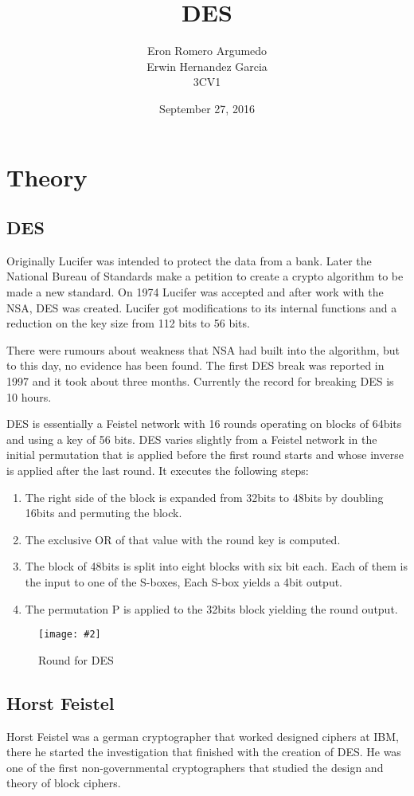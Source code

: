 \documentclass[titlepage, 12pt]{article}
\title{DES}
\author{Eron Romero Argumedo\\Erwin Hernandez Garcia\\3CV1}
\date{September 27, 2016}
\numberwithin{equation}{section}%
\numberwithin{figure}{section}%
\numberwithin{table}{section}%
\newcommand{\imagen}[4][]{
	\begin{figure}[H]
		\centering
		\texttt{[image: \#2]}
		\caption{#3}
		#4
	\end{figure}
}
\begin{document}
	\maketitle
	\tableofcontents
	\listoffigures
	\newpage
	\section{Theory}
		\subsection{DES}
		Originally Lucifer was intended to protect the data from a bank. Later the National Bureau of Standards make a petition to create a crypto algorithm to be made a new standard. On 1974 Lucifer was accepted and after work with the NSA, DES was created. Lucifer got modifications to its internal functions and a reduction on the key size from 112 bits to 56 bits.
		
		There were rumours about weakness that NSA had built into the algorithm, but to this day, no evidence has been found. The first DES break was reported in 1997 and it took about three months. Currently the record for breaking DES is 10 hours.
		
		DES is essentially a Feistel network with 16 rounds operating on blocks of 64bits and using a key of 56 bits. DES varies slightly from a Feistel network in the initial permutation that is applied before the first round starts and whose inverse is applied after the last round. It executes the following steps:
		\begin{enumerate}
			\item The right side of the block is expanded from 32bits to 48bits by doubling 16bits and permuting the block.
			\item The exclusive OR of that value with the round key is computed.
			\item The block of 48bits is split into eight blocks with six bit each. Each of them is the input to one of the S-boxes, Each S-box yields a 4bit output.
			\item The permutation P is applied to the 32bits block yielding the round output.\cite{feistel}
		\end{enumerate}
		\imagen[]{Picture2}{Round for DES}{\cite{feistel}\label{DESRound}}
		\subsection{Horst Feistel}
		Horst Feistel was a german cryptographer that worked designed ciphers at IBM, there he started the investigation that finished with the creation of DES. He was one of the first non-governmental cryptographers that studied the design and theory of block ciphers.
		
\end{document}
